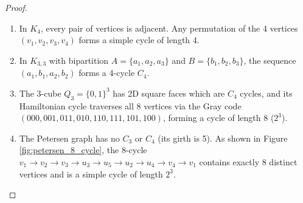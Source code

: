 \documentclass[11pt,a4paper]{article}
\theoremstyle{definition}
\begin{document}
\begin{proof}
\begin{enumerate}
    \item In $K_4$, every pair of vertices is adjacent. Any permutation of the 4 vertices $(v_1, v_2, v_3, v_4)$ forms a simple cycle of length 4.
    \item In $K_{3, 3}$ with bipartition $A = \{a_1, a_2, a_3\}$ and $B = \{b_1, b_2, b_3\}$, the sequence $(a_1, b_1, a_2, b_2)$ forms a 4-cycle $C_4$.
    \item The 3-cube $Q_3 = \{0, 1\}^3$ has 2D square faces which are $C_4$ cycles, and its Hamiltonian cycle traverses all 8 vertices via the Gray code $(000, 001, 011, 010, 110, 111, 101, 100)$, forming a cycle of length 8 ($2^3$).
    \item The Petersen graph has no $C_3$ or $C_4$ (its girth is 5). As shown in Figure \ref{fig:petersen_8_cycle}, the 8-cycle $v_1 \to v_2 \to v_3 \to u_3 \to u_5 \to u_2 \to u_4 \to v_4 \to v_1$ contains exactly 8 distinct vertices and is a simple cycle of length $2^3$.
\end{enumerate}
\end{proof}
\end{document}
